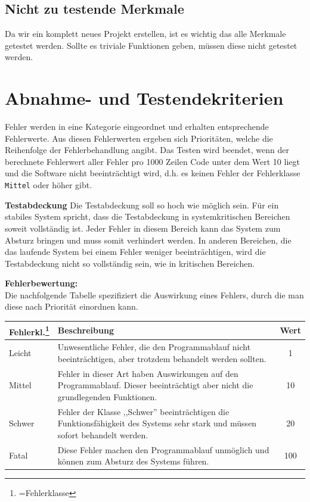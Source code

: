 \documentclass[fontsize=12pt,paper=a4,twoside]{scrartcl}
\begin{document}
\subsection{Nicht zu testende Merkmale}\label{c05}
Da wir ein komplett neues Projekt erstellen, ist es wichtig das alle Merkmale getestet werden. Sollte es triviale Funktionen geben, müssen diese nicht getestet werden.

\section{Abnahme- und Testendekriterien}\label{c07}

Fehler werden in eine Kategorie eingeordnet und erhalten entsprechende Fehlerwerte. Aus diesen Fehlerwerten ergeben sich Prioritäten, welche die Reihenfolge der Fehlerbehandlung angibt. Das Testen wird beendet, wenn der berechnete Fehlerwert aller Fehler pro 1000 Zeilen Code unter dem Wert 10 liegt und die Software nicht beeinträchtigt wird, d.h. es keinen Fehler der Fehlerklasse \texttt{Mittel} oder höher gibt.

\textbf{Testabdeckung}
Die Testabdeckung soll so hoch wie möglich sein. Für ein stabiles System spricht, dass die Testabdeckung in systemkritischen Bereichen soweit vollständig ist. Jeder Fehler in diesem Bereich kann das System zum Absturz bringen und muss somit verhindert werden. In anderen Bereichen, die das laufende System bei einem Fehler weniger beeinträchtigen, wird die Testabdeckung nicht so vollständig sein, wie in kritischen Bereichen.

\textbf{Fehlerbewertung:}\\
Die nachfolgende Tabelle spezifiziert die Auswirkung eines Fehlers, durch die man diese nach Priorität einordnen kann.\\

\begin{tabularx}{\textwidth}{|p{2cm}|p{11.53cm}|c|}
\hline
	\textbf{Fehlerkl.\footnote{=Fehlerklasse}} & \textbf{Beschreibung} & \textbf{Wert}\\
\hline
	Leicht & Unwesentliche Fehler, die den Programmablauf nicht beeinträchtigen, aber trotzdem behandelt werden sollten. & 1\\
\hline
	Mittel & Fehler in dieser Art haben Auswirkungen auf den Programmablauf. Dieser beeinträchtigt aber nicht die grundlegenden Funktionen. & 10\\
\hline
	Schwer & Fehler der Klasse ,,Schwer'' beeinträchtigen die Funktionsfähigkeit des Systems sehr stark und müssen sofort behandelt werden. & 20\\
\hline
	Fatal & Diese Fehler machen den Programmablauf unmöglich und können zum Absturz des Systems führen.  & 100\\
\hline
\end{tabularx}
\end{document}

